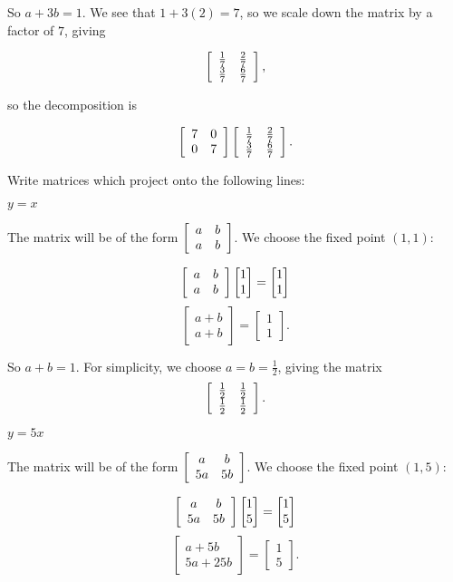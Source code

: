 \documentclass[../key.tex]{subfiles}
\begin{document}
    So $a+3b = 1$. We see that $1+3(2)=7$, so we scale down the matrix by a factor of $7$, giving

$$\left[\begin{array}{cc} \frac{1}{7} & \frac{2}{7} \\ \frac{3}{7} & \frac{6}{7} \end{array}\right],$$

 so the decomposition is

$$\left[\begin{array}{cc} 7 & 0 \\ 0 & 7 \end{array}\right]\left[\begin{array}{cc} \frac{1}{7} & \frac{2}{7} \\ \frac{3}{7} & \frac{6}{7} \end{array}\right].$$

\begin{outer_problem}
\item Write matrices which project onto the following lines:
\end{outer_problem}

\begin{inner_problem}[start=1]
\item $y=x$
\end{inner_problem}

The matrix will be of the form $\left[\begin{array}{cc} a & b \\ a & b \end{array}\right]$. We choose the fixed point $(1,1)$:

$$\left[\begin{array}{cc} a & b \\ a & b \end{array}\right]\begin{bmatrix} 1 \\ 1 \end{bmatrix} = \begin{bmatrix} 1 \\ 1 \end{bmatrix}$$
$$\begin{bmatrix} a + b \\ a + b \end{bmatrix} = \begin{bmatrix} 1 \\ 1 \end{bmatrix}.$$

So $a+b=1$. For simplicity, we choose $a=b=\frac{1}{2}$, giving the matrix $$\left[\begin{array}{cc} \frac{1}{2} & \frac{1}{2} \\ \frac{1}{2} & \frac{1}{2} \end{array}\right].$$

\begin{inner_problem}
\item $y=5x$
\end{inner_problem}

The matrix will be of the form $\left[\begin{array}{cc} a & b \\ 5a & 5b \end{array}\right]$. We choose the fixed point $(1,5)$:

$$\left[\begin{array}{cc} a & b \\ 5a & 5b \end{array}\right]\begin{bmatrix} 1 \\ 5 \end{bmatrix} = \begin{bmatrix} 1 \\ 5 \end{bmatrix}$$
$$\begin{bmatrix} a + 5b \\ 5a + 25b \end{bmatrix} = \begin{bmatrix} 1 \\ 5 \end{bmatrix}.$$
\end{document}
